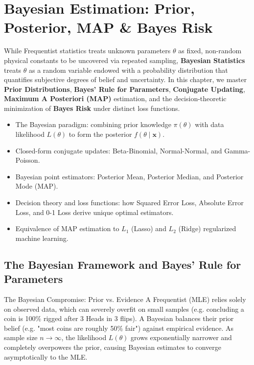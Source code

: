 \chapter{Bayesian Estimation: Prior, Posterior, MAP \& Bayes Risk}

While Frequentist statistics treats unknown parameters $\theta$ as fixed, non-random physical constants to be uncovered via repeated sampling, \textbf{Bayesian Statistics} treats $\theta$ as a random variable endowed with a probability distribution that quantifies subjective degrees of belief and uncertainty. In this chapter, we master \textbf{Prior Distributions}, \textbf{Bayes' Rule for Parameters}, \textbf{Conjugate Updating}, \textbf{Maximum A Posteriori (MAP)} estimation, and the decision-theoretic minimization of \textbf{Bayes Risk} under distinct loss functions.

\vspace{0.5cm}
\begin{tcolorbox}[colback=primarylight, colframe=primarydark, title={\textbf{What You'll Learn in this Chapter}}]
\begin{itemize}
    \item The Bayesian paradigm: combining prior knowledge $\pi(\theta)$ with data likelihood $L(\theta)$ to form the posterior $f(\theta \mid \mathbf{x})$.
    \item Closed-form conjugate updates: Beta-Binomial, Normal-Normal, and Gamma-Poisson.
    \item Bayesian point estimators: Posterior Mean, Posterior Median, and Posterior Mode (MAP).
    \item Decision theory and loss functions: how Squared Error Loss, Absolute Error Loss, and 0-1 Loss derive unique optimal estimators.
    \item Equivalence of MAP estimation to $L_1$ (Lasso) and $L_2$ (Ridge) regularized machine learning.
\end{itemize}
\end{tcolorbox}

\section{The Bayesian Framework and Bayes' Rule for Parameters}

\begin{intuitionbox}{The Bayesian Compromise: Prior vs. Evidence}
A Frequentist (MLE) relies solely on observed data, which can severely overfit on small samples (e.g. concluding a coin is 100\% rigged after 3 Heads in 3 flips). A Bayesian balances their prior belief (e.g. "most coins are roughly 50\% fair") against empirical evidence. As sample size $n \to \infty$, the likelihood $L(\theta)$ grows exponentially narrower and completely overpowers the prior, causing Bayesian estimates to converge asymptotically to the MLE.
\end{intuitionbox}


